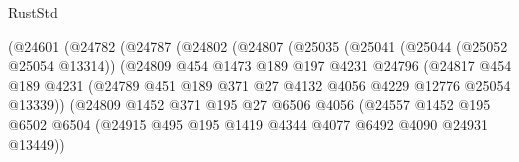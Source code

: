 \begin{lexlean}{RustStd}
\begin{coremodule}
                          (@24601
                            (@24782
                              (@24787
                                (@24802
                                  (@24807
                                    (@25035
                                      (@25041
                                        (@25044 (@25052 @25054 @13314))
                                        (@24809
                                          @454
                                          @1473
                                          @189
                                          @197
                                          @4231
                                          @24796
                                          (@24817
                                            @454
                                            @189
                                            @4231
                                            (@24789
                                              @451
                                              @189
                                              @371
                                              @27
                                              @4132
                                              @4056
                                              @4229
                                              @12776
                                              @25054
                                              @13339))
                                          (@24809
                                            @1452
                                            @371
                                            @195
                                            @27
                                            @6506
                                            @4056
                                            (@24557
                                              @1452
                                              @195
                                              @6502
                                              @6504
                                              (@24915
                                                @495
                                                @195
                                                @1419
                                                @4344
                                                @4077
                                                @6492
                                                @4090
                                                @24931
                                                @13449))

\end{coremodule}
\end{lexlean}
